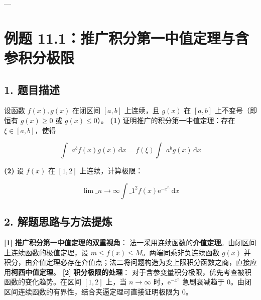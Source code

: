 \documentclass[11pt,a4paper,UTF8]{ctexart}
\begin{document}
\pagestyle{fancy}
\fancyhf{}
\fancyhead[R]{\small\color{TitlePurple}\nouppercase{\leftmark}}
\renewcommand{\headrulewidth}{0.5pt}

\tableofcontents
\newpage
{}


---


\section{例题 11.1：推广积分第一中值定理与含参积分极限}


\subsection{1. 题目描述}
设函数 $f(x), g(x)$ 在闭区间 $[a, b]$ 上连续，且 $g(x)$ 在 $[a, b]$ 上不变号（即恒有 $g(x) \ge 0$ 或 $g(x) \le 0$）。
\textbf{(1)}  证明推广的积分第一中值定理：存在 $\xi \in [a, b]$，使得

\begin{equation*}
\int\_a^b f(x)g(x)\,\mathrm{d}x = f(\xi)\int\_a^b g(x)\,\mathrm{d}x
\end{equation*}

\textbf{(2)}  设 $f(x)$ 在 $[1, 2]$ 上连续，计算极限：

\begin{equation*}
\lim\_{n \to \infty} \int\_1^2 f(x)\mathrm{e}^{-x^n}\,\mathrm{d}x
\end{equation*}



\subsection{2. 解题思路与方法提炼}
\begin{solbox}[分步推导与答题规范]
\textbf{[1]}  \textbf{推广积分第一中值定理的双重视角}：
法一采用连续函数的\textbf{介值定理}。由闭区间上连续函数的极值定理，设 $m \le f(x) \le M$。两端同乘非负连续函数 $g(x)$ 并积分，由介值定理必存在介值点；法二将问题构造为变上限积分函数之商，直接应用\textbf{柯西中值定理}。
\textbf{[2]}  \textbf{积分极限的处理}：
对于含参变量积分极限，优先考查被积函数的变化趋势。在区间 $[1, 2]$ 上，当 $n \to \infty$ 时，$\mathrm{e}^{-x^n}$ 急剧衰减趋于 $0$。由闭区间连续函数的有界性，结合夹逼定理可直接证明极限为 $0$。
\end{solbox}
\end{document}
